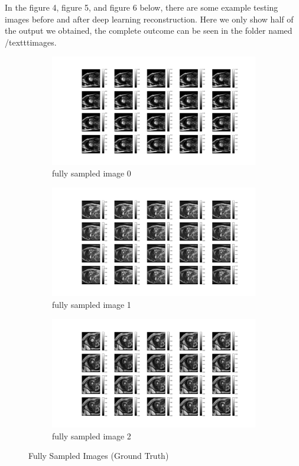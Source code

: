 \documentclass{article}
\begin{document}
In the figure 4, figure 5, and figure 6 below, there are some example testing images before and after deep 
learning reconstruction. Here we only show half of the output we obtained, the complete outcome 
can be seen in the folder named /texttt{images}.
\begin{figure}[ht]
  \centering
  \begin{subfigure}[b]{0.8\linewidth}
    \includegraphics[width=\linewidth]{../images/output/full_sampling/full_sampling_0.png}
    \caption{fully sampled image 0}
  \end{subfigure}
  \quad
  \begin{subfigure}[b]{0.8\linewidth}
    \includegraphics[width=\linewidth]{../images/output/full_sampling/full_sampling_1.png}
    \caption{fully sampled image 1}
  \end{subfigure}
  \quad
  \begin{subfigure}[b]{0.8\linewidth}
    \includegraphics[width=\linewidth]{../images/output/full_sampling/full_sampling_2.png}
    \caption{fully sampled image 2}
  \end{subfigure}
  \caption{Fully Sampled Images (Ground Truth)}
\end{figure}
\end{document}
